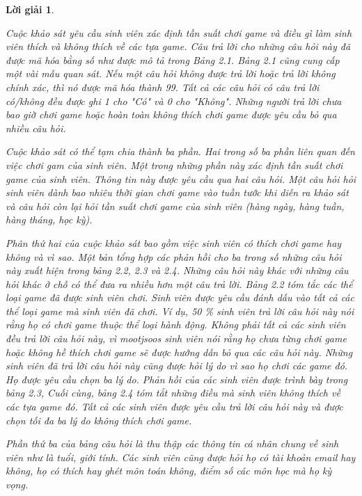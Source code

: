 \documentclass[14pt, a4paper]{article}
\theoremstyle{sltheorem}
\theoremstyle{soltheorem}
\newtheorem*{loigiai}{Lời giải}
\begin{document}
\begin{loigiai}
\begin{itemize}
        Cuộc khảo sát yêu cầu sinh viên xác định tần suất chơi game và điều gì làm sinh viên thích và không thích về các tựa game.
        Câu trả lời cho những câu hỏi này đã được mã hóa bằng số như được mô tả trong Bảng 2.1.
        Bảng 2.1 cũng cung cấp một vài mẫu quan sát. Nếu một câu hỏi không được trả lời hoặc trả lời không chính xác, thì nó được mã hóa thành 99. Tất cả các câu hỏi có câu trả lời có/không đều được ghi 1 cho "Có" và 0 cho "Không".
        Những người trả lời chưa bao giờ chơi game hoặc hoàn toàn không thích chơi game được yêu cầu bỏ qua nhiều câu hỏi.

        Cuộc khảo sát có thể tạm chia thành ba phần. Hai trong số ba phần liên quan đến việc chơi gam của sinh viên.
        Một trong những phần này xác định tần suất chơi game của sinh viên.
        Thông tin này được yêu cầu qua hai câu hỏi.
        Một câu hỏi hỏi sinh viên dành bao nhiêu thời gian chơi game vào tuần tước khi diễn ra khảo sát và câu hỏi còn lại hỏi tần suất chơi game của sinh viên (hàng ngày, hàng tuần, hàng tháng, học kỳ).

        Phân thứ hai của cuộc khảo sát bao gồm việc sinh viên có thích chơi game hay không và vì sao.
        Một bản tổng hợp các phản hồi cho ba trong số những câu hỏi này xuất hiện trong bảng 2.2,  2.3 và 2.4.
        Những câu hỏi này khác với những câu hỏi khác ở chỗ có thể đưa ra nhiều hơn một câu trả lời.
        Bảng 2.2 tóm tắc các thể loại game đã được sinh viên chơi.
        Sinh viên được yêu cầu đánh dấu vào tất cả các thể loại game mà sinh viên đã chơi.
        Ví dụ, 50 \% sinh viên trả lời câu hỏi này nói rằng họ có chơi game thuộc thể loại hành động.
        Không phải tất cả các sinh viên đều trả lời câu hỏi này, vì mootjsoos sinh viên nói rằng họ chưa từng chơi game hoặc không hề thích chơi game sẽ được hướng dẫn bỏ qua các câu hỏi này.
        Những sinh viên đã trả lời câu hỏi này cũng được hỏi lý do vì sao họ chơi các game đó.
        Họ được yêu cầu chọn ba lý do. Phản hồi của các sinh viên được trình bày trong bảng 2.3,
        Cuối cùng, bảng 2.4 tóm tắt những điều mà sinh viên không thích về các tựa game đó.
        Tất cả các sinh viên được yêu cầu trả lời câu hỏi này và được chọn tối đa ba lý do không thích chơi game.

        Phần thứ ba của bảng câu hỏi là thu thập các thông tin cá nhân chung về sinh viên như là tuổi, giới tính.
        Các sinh viên cũng được hỏi họ có tài khoản email hay không, họ có thích hay ghét môn toán không, điểm số các môn học mà họ kỳ vọng.


\end{itemize}
\end{loigiai}
\end{document}
